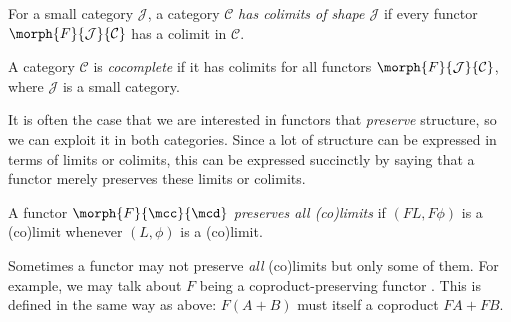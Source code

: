 \begin{definition}
    For a small category \(\mathcal{J}\), a category \(\mathcal{C}\)
    \emph{has colimits of shape \(\mathcal{J}\)} if every functor
    \(\morph{F}{\mathcal{J}}{\mathcal{C}}\) has a colimit in \(\mathcal{C}\).
\end{definition}

\begin{definition}
    A category \(\mathcal{C}\) is \emph{cocomplete} if it has colimits for all
    functors \(\morph{F}{\mathcal{J}}{\mathcal{C}}\), where \(\mathcal{J}\) is a
    small category.
\end{definition}

It is often the case that we are interested in functors that \emph{preserve}
structure, so we can exploit it in both categories.
Since a lot of structure can be expressed in terms of limits or colimits, this
can be expressed succinctly by saying that a functor merely preserves these
limits or colimits.

\begin{definition}
    A functor \(\morph{F}{\mcc}{\mcd}\) \emph{preserves all (co)limits} if
    \((FL,F\phi)\) is a (co)limit whenever \((L,\phi)\) is a (co)limit.
\end{definition}

Sometimes a functor may not preserve \emph{all} (co)limits but only some of
them.
For example, we may talk about \(F\) being a coproduct-preserving functor .
This is defined in the same way as above: \(F(A+B)\) must itself a coproduct
\(FA + FB\).